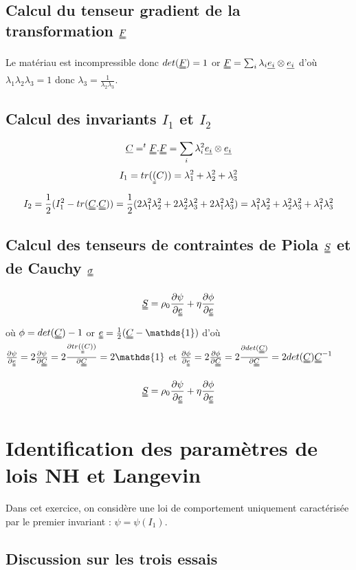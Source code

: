 \documentclass[a4paper,11pt]{article}
\begin{document}
\subsection{Calcul du tenseur gradient de la transformation $\uuline{F}$}
Le matériau est incompressible donc $det(\uuline{F})=1$ or $\uuline{F}=\sum_{i} \lambda_i \uline{e_i}\otimes \uline{e_i}$ d'où $\lambda_1\lambda_2\lambda_3=1$ donc $\lambda_3=\frac{1}{\lambda_2\lambda_3} $.

\subsection{Calcul des invariants $I_1$ et $I_2$}
$$\uline{C}=^t\uuline{F}.\uuline{F}=\sum_{i} \lambda_i ^2\uline{e_i}\otimes \uline{e_i}$$
$$I_1= tr(\uuline(C))=\lambda_1^2+\lambda_2^2+\lambda_3^2$$
$$I_2=\frac{1}{2}(I_1^2 - tr(\uuline{C}.\uuline{C})) =\frac{1}{2}(2\lambda_1^2\lambda_2^2+2\lambda_2^2\lambda_3^2+2\lambda_1^2\lambda_3^2) =\lambda_1^2\lambda_2^2+\lambda_2^2\lambda_3^2+\lambda_1^2\lambda_3^2  $$

\subsection{Calcul des tenseurs de contraintes de Piola $\uuline{S}$ et de Cauchy $\uuline{\sigma}$}
$$ \uuline{S} = \rho_0 \frac{\partial \psi}{\partial \uuline{e}} + \eta\frac{\partial \phi}{\partial \uuline{e}} $$ où $\phi= det(\uuline{C})-1 $
or $\uuline{e}=\frac{1}{2}(\uuline{C}-\mathds{1})$ d'où $\frac{\partial \psi}{\partial \uuline{e}} =2 \frac{\partial \psi}{\partial \uuline{C}} = 2 \frac{\partial tr(\uuline(C))}{\partial \uuline{C}} = 2 \mathds{1}$
et $\frac{\partial \phi}{\partial \uuline{e}} = 2 \frac{\partial \phi}{\partial \uuline{C}}= 2 \frac{\partial det(\uuline{C})}{\partial \uuline{C}}= 2 det(\uuline{C}) \uuline{C}^{-1}$

$$\uuline{S} = \rho_0 \frac{\partial \psi}{\partial \uuline{e}} + \eta\frac{\partial \phi}{\partial \uuline{e}} $$


\section{Identification des paramètres de lois NH et Langevin}

Dans cet exercice, on considère une loi de comportement uniquement caractérisée par le premier invariant : $\psi = \psi(I_1)$.

\subsection {Discussion sur les trois essais}
\end{document}
